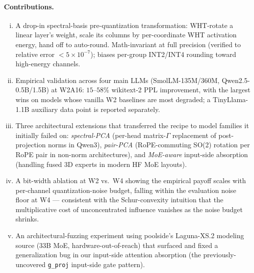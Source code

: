 \documentclass[11pt]{article}
\begin{document}
\paragraph{Contributions.}
\begin{enumerate}[(i)]
    \item A drop-in spectral-basis pre-quantization transformation: WHT-rotate a linear layer's weight, scale its columns by per-coordinate WHT activation energy, hand off to auto-round. Math-invariant at full precision (verified to relative error $<5\times10^{-7}$); biases per-group INT2/INT4 rounding toward high-energy channels.
    \item Empirical validation across four main LLMs (SmolLM-135M/360M, Qwen2.5-0.5B/1.5B) at W2A16: $15$--$58\%$ wikitext-2 PPL improvement, with the largest wins on models whose vanilla W2 baselines are most degraded; a TinyLlama-1.1B auxiliary data point is reported separately.
    \item Three architectural extensions that transferred the recipe to model families it initially failed on: \emph{spectral-PCA} (per-head matrix-$\Gamma$ replacement of post-projection norms in Qwen3), \emph{pair-PCA} (RoPE-commuting SO(2) rotation per RoPE pair in non-norm architectures), and \emph{MoE-aware} input-side absorption (handling fused 3D experts in modern HF MoE layouts).
    \item A bit-width ablation at W2 vs.\ W4 showing the empirical payoff scales with per-channel quantization-noise budget, falling within the evaluation noise floor at W4 --- consistent with the Schur-convexity intuition that the multiplicative cost of unconcentrated influence vanishes as the noise budget shrinks.
    \item An architectural-fuzzing experiment using poolside's Laguna-XS.2 modeling source (33B MoE, hardware-out-of-reach) that surfaced and fixed a generalization bug in our input-side attention absorption (the previously-uncovered \texttt{g\_proj} input-side gate pattern).
\end{enumerate}
\end{document}
